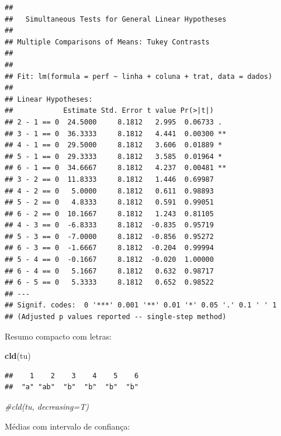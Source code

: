 \documentclass[
]{book}
\newenvironment{Shaded}{\begin{snugshade}}{\end{snugshade}}
\newcommand{\CommentTok}[1]{\textcolor[rgb]{0.56,0.35,0.01}{\textit{#1}}}
\newcommand{\DataTypeTok}[1]{\textcolor[rgb]{0.13,0.29,0.53}{#1}}
\newcommand{\KeywordTok}[1]{\textcolor[rgb]{0.13,0.29,0.53}{\textbf{#1}}}
\newcommand{\NormalTok}[1]{#1}
\newcommand{\OperatorTok}[1]{\textcolor[rgb]{0.81,0.36,0.00}{\textbf{#1}}}
\newcommand{\StringTok}[1]{\textcolor[rgb]{0.31,0.60,0.02}{#1}}
\begin{document}
\begin{verbatim}
## 
##   Simultaneous Tests for General Linear Hypotheses
## 
## Multiple Comparisons of Means: Tukey Contrasts
## 
## 
## Fit: lm(formula = perf ~ linha + coluna + trat, data = dados)
## 
## Linear Hypotheses:
##            Estimate Std. Error t value Pr(>|t|)   
## 2 - 1 == 0  24.5000     8.1812   2.995  0.06733 . 
## 3 - 1 == 0  36.3333     8.1812   4.441  0.00300 **
## 4 - 1 == 0  29.5000     8.1812   3.606  0.01889 * 
## 5 - 1 == 0  29.3333     8.1812   3.585  0.01964 * 
## 6 - 1 == 0  34.6667     8.1812   4.237  0.00481 **
## 3 - 2 == 0  11.8333     8.1812   1.446  0.69987   
## 4 - 2 == 0   5.0000     8.1812   0.611  0.98893   
## 5 - 2 == 0   4.8333     8.1812   0.591  0.99051   
## 6 - 2 == 0  10.1667     8.1812   1.243  0.81105   
## 4 - 3 == 0  -6.8333     8.1812  -0.835  0.95719   
## 5 - 3 == 0  -7.0000     8.1812  -0.856  0.95272   
## 6 - 3 == 0  -1.6667     8.1812  -0.204  0.99994   
## 5 - 4 == 0  -0.1667     8.1812  -0.020  1.00000   
## 6 - 4 == 0   5.1667     8.1812   0.632  0.98717   
## 6 - 5 == 0   5.3333     8.1812   0.652  0.98522   
## ---
## Signif. codes:  0 '***' 0.001 '**' 0.01 '*' 0.05 '.' 0.1 ' ' 1
## (Adjusted p values reported -- single-step method)
\end{verbatim}

Resumo compacto com letras:

\begin{Shaded}
\begin{Highlighting}[]
\KeywordTok{cld}\NormalTok{(tu)}
\end{Highlighting}
\end{Shaded}

\begin{verbatim}
##    1    2    3    4    5    6 
##  "a" "ab"  "b"  "b"  "b"  "b"
\end{verbatim}

\begin{Shaded}
\begin{Highlighting}[]
\CommentTok{#cld(tu, decreasing=T)}
\end{Highlighting}
\end{Shaded}

Médias com intervalo de confiança:

\begin{Shaded}
\end{Shaded}
\end{document}
